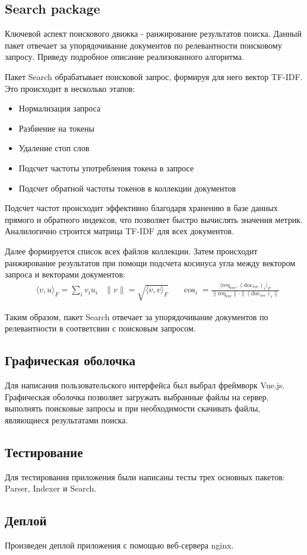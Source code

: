 \subsection{Search package}
Ключевой аспект поискового движка - ранжирование результатов поиска. Данный пакет отвечает за упорядочивание 
документов по релевантности поисковому запросу. Приведу подробное описание реализованного алгоритма. 

Пакет Search обрабатывает поисковой запрос, формируя для него вектор TF-IDF. Это происходит в несколько этапов:
\begin{itemize}
    \item Нормализация запроса
    \item Разбиение на токены
    \item Удаление стоп слов
    \item Подсчет частоты употребления токена в запросе
    \item Подсчет обратной частоты токенов в коллекции документов
\end{itemize}

Подсчет частот происходит эффективно благодаря хранению в базе данных прямого и обратного индексов, что
позволяет быстро вычислять значения метрик. Аналилогично строится матрица TF-IDF для всех документов. 

Далее формируется список всех файлов коллекции. Затем происходит ранжирование результатов при помощи 
подсчета косинуса угла между вектором запроса и векторами документов:
\begin{align*}
    &\langle v, u \rangle_F = \sum_i v_iu_i
    &\|v\| = \sqrt{\langle v, v \rangle_F}&
    &\cos_i = \frac{\langle \mathrm{req_{vec}}, (\mathrm{doc_{vec}})_i\rangle_F}{\|\mathrm{req_{vec}\| \cdot \|(\mathrm{doc_{vec}})_i\|}}
\end{align*}

Таким образом, пакет Search отвечает за упорядочивание документов по релевантности в соответсвии с поисковым запросом. 

\subsection{Графическая оболочка}
Для написания пользовательского интерфейса был выбрал фреймворк Vue.js. Графическая оболочка позволяет 
загружать выбранные файлы на сервер, выполнять поисковые запросы и при необходимости скачивать
файлы, являющиеся результатами поиска. 

\subsection{Тестирование}
Для тестирования приложения были написаны тесты трех основных пакетов: Parser, Indexer и Search. 

\subsection{Деплой}
Произведен деплой приложения с помощью веб-сервера nginx. 